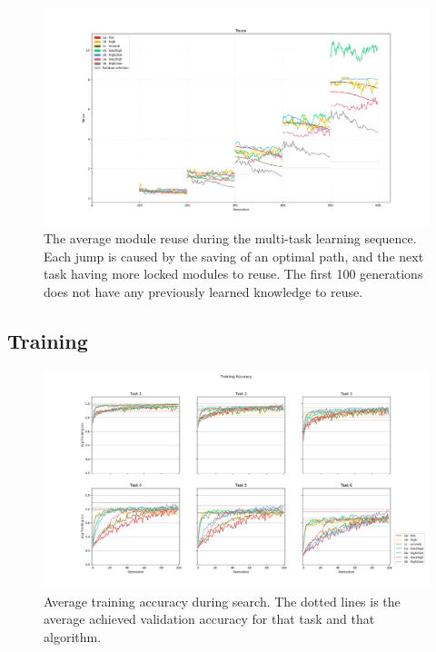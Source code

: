 \begin{figure}[h]
    \includegraphics[width=\textwidth]{Chapters/Experiments/search_algo/figures/Module_reuse_pr_generation.png}
    \caption{The average module reuse during the multi-task learning sequence. Each jump is caused by the saving of an optimal path, and the next task having more locked modules to reuse. The first 100 generations does not have any previously learned knowledge to reuse.}
    \label{fig:search.reuse}
\end{figure}

\subsection{Training}
\begin{figure}[h]
    \includegraphics[width=\textwidth]{Chapters/Experiments/search_algo/figures/Training_accuracy.png}
    \caption{Average training accuracy during search. The dotted lines is the average achieved validation accuracy for that task and that algorithm.}
    \label{fig:search.accuracy}
\end{figure}

